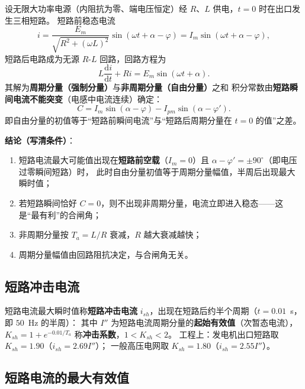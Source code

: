 设无限大功率电源（内阻抗为零、端电压恒定）经 $R$、$L$ 供电，$t=0$ 时在出口发生三相短路。
短路前稳态电流
\begin{equation}
  i=\frac{E_m}{\sqrt{R^{2}+(\omega L)^{2}}}\sin(\omega t+\alpha-\varphi)
  =I_m\sin(\omega t+\alpha-\varphi),
\end{equation}
短路后电路成为无源 $R$-$L$ 回路，回路方程为
\begin{equation}
  L\frac{\mathrm{d}i}{\mathrm{d}t}+Ri=E_m\sin(\omega t+\alpha).
\end{equation}
其解为\textbf{周期分量（强制分量）}与\textbf{非周期分量（自由分量）}之和
积分常数由\textbf{短路瞬间电流不能突变}（电感中电流连续）确定：
\begin{equation}
  C=I_m\sin(\alpha-\varphi)-I_{pm}\sin(\alpha-\varphi').
\end{equation}
即自由分量的初值等于“短路前瞬间电流”与“短路后周期分量在 $t=0$ 的值”之差。

\textbf{结论（写清条件）}：
\begin{enumerate}
  \item 短路电流最大可能值出现在\textbf{短路前空载}（$I_m=0$）且
        $\alpha-\varphi'=\pm90^\circ$（即电压过零瞬间短路）时，
        此时自由分量初值等于周期分量幅值，半周后出现最大瞬时值；
  \item 若短路瞬间恰好 $C=0$，则不出现非周期分量，电流立即进入稳态——这是“最有利”的合闸角；
  \item 非周期分量按 $T_a=L/R$ 衰减，$R$ 越大衰减越快；
  \item 周期分量幅值由回路阻抗决定，与合闸角无关。
\end{enumerate}

\subsection{短路冲击电流}

短路电流最大瞬时值称\textbf{短路冲击电流} $i_{sh}$，出现在短路后约半个周期（$t=0.01$~s，
即 $50$~Hz 的半周）：
其中 $I''$ 为短路电流周期分量的\textbf{起始有效值}（次暂态电流），
$K_{sh}=1+e^{-0.01/T_a}$ 称\textbf{冲击系数}，$1<K_{sh}<2$。
工程上：发电机出口短路取 $K_{sh}=1.90$（$i_{sh}=2.69I''$）；
一般高压电网取 $K_{sh}=1.80$（$i_{sh}=2.55I''$）。

\subsection{短路电流的最大有效值}

